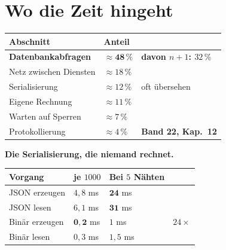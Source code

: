 \chapter{Wo die Zeit hingeht}\label{kap:zeit_hin}

\begin{merksatz}
\begin{center}
{\small
\renewcommand{\arraystretch}{1.5}
\begin{tabular}{@{}P{3.0cm}P{2.0cm}P{2.6cm}@{}}
\toprule
\textbf{Abschnitt} & \textbf{Anteil} & \\
\midrule
\textbf{Datenbank\-abfragen} & $\approx\mathbf{48\,\%}$ & \textcolor{akzent}{\textbf{davon $n{+}1$: $32\,\%$}}\\
Netz zwischen Diensten & $\approx18\,\%$ & \\
Serialisierung & $\approx12\,\%$ & \textcolor{akzent}{oft übersehen}\\
Eigene Rechnung & $\approx11\,\%$ & \\
Warten auf Sperren & $\approx7\,\%$ & \\
Protokollierung & $\approx4\,\%$ & \textbf{Band 22, Kap.~12}\\
\bottomrule
\end{tabular}}
\end{center}

\begin{center}
\begin{minipage}{0.88\textwidth}
\end{minipage}
\end{center}

\textbf{Die Serialisierung, die niemand rechnet.}

\begin{center}
\renewcommand{\arraystretch}{1.45}
\begin{tabular}{@{}P{2.6cm}P{2.2cm}P{2.4cm}P{2.0cm}@{}}
\toprule
\textbf{Vorgang} & \textbf{je $1000$} & \textbf{Bei $5$ Nähten} & \\
\midrule
JSON erzeugen & $4{,}8$ ms & $\mathbf{24}$ ms & \\
JSON lesen & $6{,}1$ ms & $\mathbf{31}$ ms & \\
Binär erzeugen & $\mathbf{0{,}2}$ ms & $1$ ms & $24\times$\\
Binär lesen & $0{,}3$ ms & $1{,}5$ ms & \\
\bottomrule
\end{tabular}
\end{center}


\end{merksatz}
